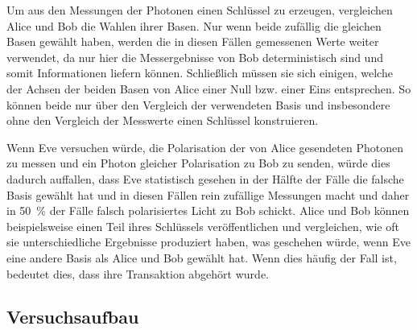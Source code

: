 Um aus den Messungen der Photonen einen Schlüssel zu erzeugen, vergleichen
Alice und Bob die Wahlen ihrer Basen. Nur wenn beide zufällig die gleichen Basen
gewählt haben, werden die in diesen Fällen gemessenen Werte weiter verwendet, da
nur hier die Messergebnisse von Bob deterministisch sind und somit Informationen
liefern können. Schließlich müssen sie sich einigen, welche der Achsen der
beiden Basen von Alice einer Null bzw. einer Eins entsprechen. So können beide
nur über den Vergleich der verwendeten Basis und insbesondere ohne den
Vergleich der Messwerte einen Schlüssel konstruieren.

Wenn Eve versuchen würde, die Polarisation der von Alice gesendeten Photonen zu
messen und ein Photon gleicher Polarisation zu Bob zu senden, würde dies
dadurch auffallen, dass Eve statistisch gesehen in der Hälfte der Fälle die
falsche Basis gewählt hat und in diesen Fällen rein zufällige Messungen macht
und daher in \SI{50}{\percent} der Fälle falsch polarisiertes Licht zu Bob
schickt. Alice und Bob können beispielsweise einen Teil ihres Schlüssels
veröffentlichen und vergleichen, wie oft sie unterschiedliche Ergebnisse
produziert haben, was geschehen würde, wenn Eve eine andere Basis als Alice und
Bob gewählt hat. Wenn dies häufig der Fall ist, bedeutet dies, dass ihre
Transaktion abgehört wurde. 

\subsection{Versuchsaufbau}